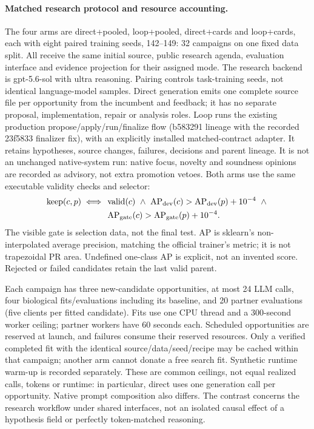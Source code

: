 \paragraph{Matched research protocol and resource accounting.}
The four arms are direct+pooled, loop+pooled, direct+cards and loop+cards,
each with eight paired training seeds, 142--149: 32 campaigns on one fixed
data split. All receive the same initial source, public research agenda,
evaluation interface and evidence projection for their assigned mode.
The research backend is gpt-5.6-sol with ultra reasoning. Pairing controls
task-training seeds, not identical language-model samples.
Direct generation emits one complete source file per opportunity from the
incumbent and feedback; it has no separate proposal, implementation, repair
or analysis roles. Loop runs the existing production propose/apply/run/finalize
flow (b583291 lineage with the recorded 23f5833 finalizer fix), with an
explicitly installed matched-contract adapter. It retains
hypotheses, source changes, failures, decisions and parent lineage.
It is not an unchanged native-system run: native focus, novelty and
soundness opinions are recorded as advisory, not extra promotion vetoes.
Both arms use the same executable validity checks and selector:
\[
\begin{aligned}
\operatorname{keep}(c,p)\iff{}&\operatorname{valid}(c)\ \land\
\operatorname{AP}_{\rm dev}(c)>\operatorname{AP}_{\rm dev}(p)+10^{-4}\ \land{}\\
&\operatorname{AP}_{\rm gate}(c)>\operatorname{AP}_{\rm gate}(p)+10^{-4}.
\end{aligned}
\]
The visible gate is selection data, not the final test. AP is sklearn's
non-interpolated average precision, matching the official trainer's metric;
it is not trapezoidal PR area. Undefined one-class AP is explicit, not an
invented score. Rejected or failed candidates retain the last valid parent.

Each campaign has three new-candidate opportunities, at most 24 LLM calls,
four biological fits/evaluations including its baseline, and 20 partner
evaluations (five clients per fitted candidate). Fits use one CPU thread
and a 300-second worker ceiling; partner workers have 60 seconds each.
Scheduled opportunities are reserved at launch, and failures consume their
reserved resources. Only a verified completed fit with the identical
source/data/seed/recipe may be cached within that campaign; another arm
cannot donate a free search fit. Synthetic runtime warm-up is recorded
separately. These are common ceilings, not equal realized calls, tokens or
runtime: in particular, direct uses one generation call per opportunity.
Native prompt composition also differs. The contrast concerns the
research workflow under shared interfaces, not an isolated causal effect
of a hypothesis field or perfectly token-matched reasoning.

